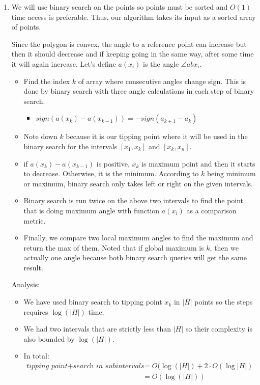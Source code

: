 \begin{enumerate}
  \item

  We will use binary search on the points so points must be sorted and $O(1)$ time access is preferable. Thus, our algorithm takes its input as a sorted array of points. 

  Since the polygon is convex, the angle to a reference point can increase but then it should decrease and if keeping going in the same way, after some time it will again increase. Let's define $a(x_i)$ is the angle $\angle{abx_i}$.

  \begin{itemize}
    \item Find the index $k$ of array where consecutive angles change sign. This is done by binary search with three angle calculations in each step of binary search.
    \begin{itemize}
      \item $sign(a(x_k) - a(x_{k-1})) = - sign(a_{k+1} - a_k)$
    \end{itemize}
    \item Note down $k$ because it is our tipping point where it will be used in the binary search for the intervals $[x_1, x_k]$ and $[x_k, x_n]$.
    \item if $a(x_k) - a(x_{k-1})$ is positive, $x_k$ is maximum point and then it starts to decrease. Otherwise, it is the minimum. According to $k$ being minimum or maximum, binary search only takes left or right on the given intervals.
    \item Binary search is run twice on the above two intervals to find the point that is doing maximum angle with function $a(x_i)$ as a comparison metric.
    \item Finally, we compare two local maximum angles to find the maximum and return the max of them. Noted that if global maximum is $k$, then we actually one angle because both binary search queries will get the same result.
  \end{itemize}

Analysis:
  \begin{itemize}
    \item We have used binary search to tipping point $x_k$ in $|H|$ points so the steps requires $\log(|H|)$ time.
    \item We had two intervals that are strictly less than $|H|$ so their complexity is also bounded by $\log(|H|)$.
    \item In total:
    \begin{align*}
      \textit{tipping point} + \textit{search in subintervals} &= O(\log(|H|) + 2 \cdot O(\log|H|) \\
      &= O(\log(|H|))   
    \end{align*}    
  \end{itemize}


\end{enumerate}
